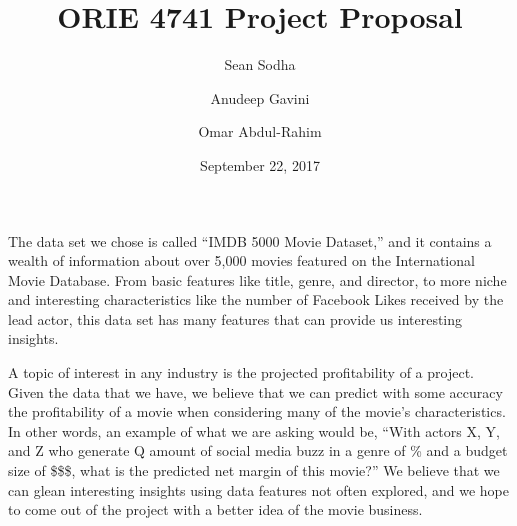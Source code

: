 \documentclass{article}
\begin{document}
\title{ORIE 4741 Project Proposal}
\author{Sean Sodha \and Anudeep Gavini \and Omar Abdul-Rahim}
\date{September 22, 2017}

\maketitle

The data set we chose is called ``IMDB 5000 Movie Dataset,'' and it contains a wealth of information about over 5,000 movies featured on the International Movie Database. From basic features like title, genre, and director, to more niche and interesting characteristics like the number of Facebook Likes received by the lead actor, this data set has many features that can provide us interesting insights.

A topic of interest in any industry is the projected profitability of a project. Given the data that we have, we believe that we can predict with some accuracy the profitability of a movie when considering many of the movie's characteristics. In other words, an example of what we are asking would be, ``With actors X, Y, and Z who generate Q amount of social media buzz in a genre of \% and a budget size of \$\$\$, what is the predicted net margin of this movie?'' We believe that we can glean interesting insights using data features not often explored, and we hope to come out of the project with a better idea of the movie business.
\end{document}
